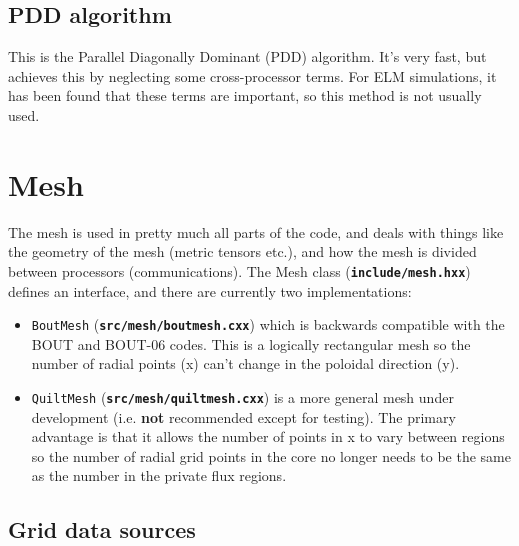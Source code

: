 \documentclass[12pt]{article}
\newcommand{\file}[1]{\texttt{\bf #1}}
\begin{document}
\subsection{PDD algorithm}

This is the Parallel Diagonally Dominant (PDD) algorithm. It's very fast, but
achieves this by neglecting some cross-processor terms. For ELM simulations, 
it has been found that these terms are important, so this method is not
usually used. 

\section{Mesh}
The mesh is used in pretty much all parts of the code, and deals with 
things like the geometry of the mesh (metric tensors etc.), and how the
mesh is divided between processors (communications). The Mesh class
(\file{include/mesh.hxx}) defines an interface, and there are currently
two implementations:
\begin{itemize}
\item \lstinline!BoutMesh! (\file{src/mesh/boutmesh.cxx})  which is backwards compatible
  with the BOUT and BOUT-06 codes. This is a logically rectangular mesh so
  the number of radial points (x) can't change in the poloidal direction (y). 
  
\item \lstinline!QuiltMesh! (\file{src/mesh/quiltmesh.cxx})  is a more general mesh under development
  (i.e. {\bf not} recommended except for testing). The primary advantage is that
  it allows the number of points in x to vary between regions so the number of radial
  grid points in the core no longer needs to be the same as the number in the private
  flux regions.
\end{itemize}

\subsection{Grid data sources}
\end{document}
